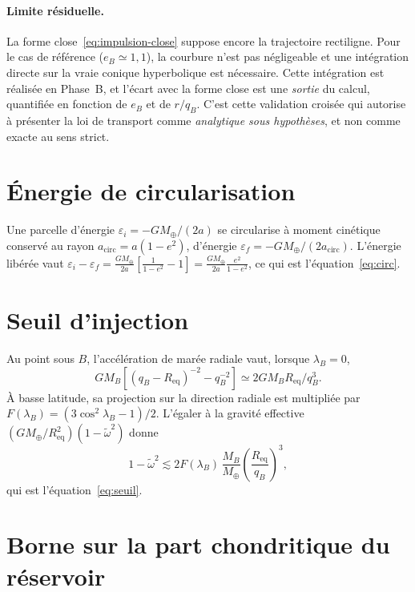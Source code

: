 \documentclass[11pt,a4paper,openany]{report}
\newcommand{\Mt}{M_{\oplus}}
\newcommand{\Req}{R_{\mathrm{eq}}}
\begin{document}
\paragraph{Limite résiduelle.}
La forme close~\eqref{eq:impulsion-close} suppose encore la trajectoire rectiligne. Pour le cas de
référence ($e_B\simeq1{,}1$), la courbure n'est pas négligeable et une intégration directe sur la
vraie conique hyperbolique est nécessaire. Cette intégration est réalisée en Phase~B, et l'écart
avec la forme close est une \emph{sortie} du calcul, quantifiée en fonction de $e_B$ et de
$r/q_B$. C'est cette validation croisée qui autorise à présenter la loi de transport comme
\emph{analytique sous hypothèses}, et non comme exacte au sens strict.

\section{Énergie de circularisation}

Une parcelle d'énergie $\varepsilon_i=-G\Mt/(2a)$ se circularise à moment cinétique conservé au
rayon $a_{\mathrm{circ}}=a(1-e^2)$, d'énergie $\varepsilon_f=-G\Mt/(2a_{\mathrm{circ}})$. L'énergie
libérée vaut
$\varepsilon_i-\varepsilon_f=\frac{G\Mt}{2a}\left[\frac{1}{1-e^2}-1\right]=\frac{G\Mt}{2a}\frac{e^2}{1-e^2}$,
ce qui est l'équation~\eqref{eq:circ}.

\section{Seuil d'injection}

Au point sous $B$, l'accélération de marée radiale vaut, lorsque $\lambda_B=0$,
\begin{equation}
GM_B\left[(q_B-\Req)^{-2}-q_B^{-2}\right]\simeq2GM_B\Req/q_B^3.
\end{equation}
À basse latitude, sa projection sur la direction radiale est multipliée par
$F(\lambda_B)=(3\cos^2\lambda_B-1)/2$. L'égaler à la gravité effective
$(G\Mt/\Req^2)(1-\tilde\omega^2)$ donne
\begin{equation}
1-\tilde\omega^2\lesssim2F(\lambda_B)\,\frac{M_B}{\Mt}\left(\frac{\Req}{q_B}\right)^3,
\end{equation}
qui est l'équation~\eqref{eq:seuil}.

\section{Borne sur la part chondritique du réservoir}
\label{app:borneW}
\end{document}
